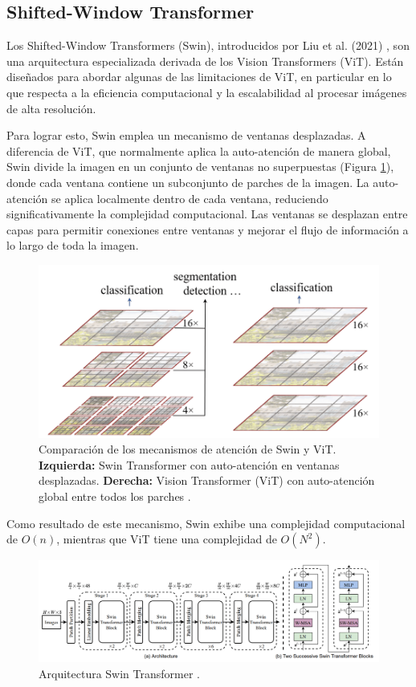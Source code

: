 \documentclass[a4paper,10pt]{book}
\begin{document}
\subsection{Shifted-Window Transformer}

Los Shifted-Window Transformers (Swin), introducidos por Liu et al. (2021) \cite{liu_swin_2021}, son una arquitectura especializada derivada de los Vision Transformers (ViT). Están diseñados para abordar algunas de las limitaciones de ViT, en particular en lo que respecta a la eficiencia computacional y la escalabilidad al procesar imágenes de alta resolución.

Para lograr esto, Swin emplea un mecanismo de ventanas desplazadas. A diferencia de ViT, que normalmente aplica la auto-atención de manera global, Swin divide la imagen en un conjunto de ventanas no superpuestas (Figura \ref{fig:swin_vit}), donde cada ventana contiene un subconjunto de parches de la imagen. La auto-atención se aplica localmente dentro de cada ventana, reduciendo significativamente la complejidad computacional. Las ventanas se desplazan entre capas para permitir conexiones entre ventanas y mejorar el flujo de información a lo largo de toda la imagen.

\begin{figure}[h!]
\centering
\includegraphics[width=0.6\linewidth]{reports//assets/Swin.png}
\caption[Comparison of Swin and ViT mechanisms]{Comparación de los mecanismos de atención de Swin y ViT. \textbf{Izquierda:} Swin Transformer con auto-atención en ventanas desplazadas. \textbf{Derecha:} Vision Transformer (ViT) con auto-atención global entre todos los parches \cite{liu_swin_2021}.}
\label{fig:swin_vit}
\end{figure}

Como resultado de este mecanismo, Swin exhibe una complejidad computacional de $O(n)$, mientras que ViT tiene una complejidad de $O(N^2)$.


\begin{figure}[h!]
\centering
\includegraphics[width=1.0\linewidth]{reports//assets/SwinArch.png}
\caption[Swin Transformer Arch]{Arquitectura Swin Transformer \cite{liu_swin_2021}.}
\label{fig:swin_arch}
\end{figure}
\end{document}
